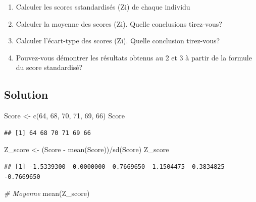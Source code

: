\documentclass[
]{article}
\newenvironment{Shaded}{\begin{snugshade}}{\end{snugshade}}
\newcommand{\CommentTok}[1]{\textcolor[rgb]{0.56,0.35,0.01}{\textit{#1}}}
\newcommand{\DecValTok}[1]{\textcolor[rgb]{0.00,0.00,0.81}{#1}}
\newcommand{\FunctionTok}[1]{\textcolor[rgb]{0.00,0.00,0.00}{#1}}
\newcommand{\NormalTok}[1]{#1}
\newcommand{\OtherTok}[1]{\textcolor[rgb]{0.56,0.35,0.01}{#1}}
\newcommand{\SpecialCharTok}[1]{\textcolor[rgb]{0.00,0.00,0.00}{#1}}
\providecommand{\tightlist}{%
  \setlength{\itemsep}{0pt}\setlength{\parskip}{0pt}}
\begin{document}
\begin{enumerate}
\def\labelenumi{\arabic{enumi}.}
\tightlist
\item
  Calculer les scores sstandardisés (Zi) de chaque individu
\item
  Calculer la moyenne des scores (Zi). Quelle conclusions tirez-vous?
\item
  Calculer l'écart-type des scores (Zi). Quelle conclusion tirez-vous?
\item
  Pouvez-vous démontrer les résultats obtenus au 2 et 3 à partir de la
  formule du score standardisé?
\end{enumerate}

\hypertarget{solution}{%
\subsection{Solution}\label{solution}}

\begin{Shaded}
\begin{Highlighting}[]
\NormalTok{Score }\OtherTok{\textless{}{-}} \FunctionTok{c}\NormalTok{(}\DecValTok{64}\NormalTok{, }\DecValTok{68}\NormalTok{, }\DecValTok{70}\NormalTok{, }\DecValTok{71}\NormalTok{, }\DecValTok{69}\NormalTok{, }\DecValTok{66}\NormalTok{)}
\NormalTok{Score}
\end{Highlighting}
\end{Shaded}

\begin{verbatim}
## [1] 64 68 70 71 69 66
\end{verbatim}

\begin{Shaded}
\begin{Highlighting}[]
\NormalTok{Z\_score }\OtherTok{\textless{}{-}}\NormalTok{ (Score }\SpecialCharTok{{-}} \FunctionTok{mean}\NormalTok{(Score))}\SpecialCharTok{/}\FunctionTok{sd}\NormalTok{(Score)}
\NormalTok{Z\_score}
\end{Highlighting}
\end{Shaded}

\begin{verbatim}
## [1] -1.5339300  0.0000000  0.7669650  1.1504475  0.3834825 -0.7669650
\end{verbatim}

\begin{Shaded}
\begin{Highlighting}[]
\CommentTok{\# Moyenne}
\FunctionTok{mean}\NormalTok{(Z\_score)}
\end{Highlighting}
\end{Shaded}
\end{document}
